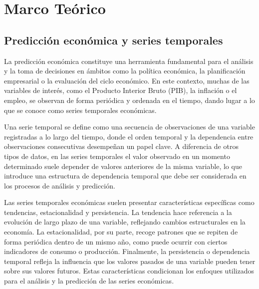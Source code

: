 
\chapter{Marco Teórico}
\label{marcoteorico}

\section{Predicción económica y series temporales}

La predicción económica constituye una herramienta fundamental para el análisis y la toma de decisiones en ámbitos como la política económica, la planificación empresarial o la evaluación del ciclo económico. En este contexto, muchas de las variables de interés, como el Producto Interior Bruto (PIB), la inflación o el empleo, se observan de forma periódica y ordenada en el tiempo, dando lugar a lo que se conoce como series temporales económicas.

Una serie temporal se define como una secuencia de observaciones de una variable registradas a lo largo del tiempo, donde el orden temporal y la dependencia entre observaciones consecutivas desempeñan un papel clave. A diferencia de otros tipos de datos, en las series temporales el valor observado en un momento determinado suele depender de valores anteriores de la misma variable, lo que introduce una estructura de dependencia temporal que debe ser considerada en los procesos de análisis y predicción.

Las series temporales económicas suelen presentar características específicas como tendencias, estacionalidad y persistencia. La tendencia hace referencia a la evolución de largo plazo de una variable, reflejando cambios estructurales en la economía. La estacionalidad, por su parte, recoge patrones que se repiten de forma periódica dentro de un mismo año, como puede ocurrir con ciertos indicadores de consumo o producción. Finalmente, la persistencia o dependencia temporal refleja la influencia que los valores pasados de una variable pueden tener sobre sus valores futuros. Estas características condicionan los enfoques utilizados para el análisis y la predicción de las series económicas. \citep{hyndman_athanasopoulos_fpp3}

